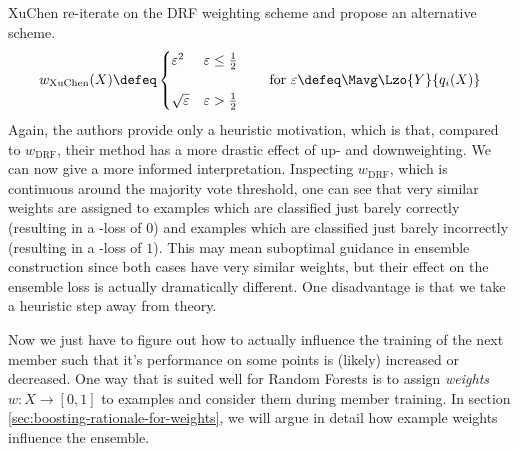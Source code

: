 \documentclass[../main.tex]{subfiles}
\begin{document}
XuChen re-iterate on the DRF weighting scheme and propose an alternative scheme.
$$
w_{\text{XuChen}}(X) \defeq \begin{cases}
\varepsilon^2 & \varepsilon \leq \frac{1}{2} \\ \\
\sqrt{\varepsilon} & \varepsilon > \frac{1}{2}
\end{cases}
\hspace{2em} \text{for~}  \varepsilon \defeq \Mavg \Lzo{Y}{q_i(X)}
$$
Again, the authors provide only a heuristic motivation, which is that, compared to $w_{\text{DRF}}$, their method has a more drastic effect of up- and downweighting. We can now give a more informed interpretation. Inspecting $w_{\text{DRF}}$, which is continuous around the majority vote threshold, one can see that very similar weights are assigned to examples which are classified just barely correctly (resulting in a \zeroone-loss of $0$) and examples which are classified just barely incorrectly (resulting in a \zeroone-loss of $1$). This may mean suboptimal guidance in ensemble construction since both cases have very similar weights, but their effect on the ensemble loss is actually dramatically different. One disadvantage is that we take a heuristic step away from theory. %




Now we just have to figure out
how to actually influence the training of the next member such that it's performance on some points is (likely) increased or decreased. One way that is suited well for Random Forests
is to assign \textit{weights} $w: X \to [0,1]$ to examples and consider them during member training. 
In section \ref{sec:boosting-rationale-for-weights}, we will argue in detail how example weights influence the ensemble. %
\end{document}
